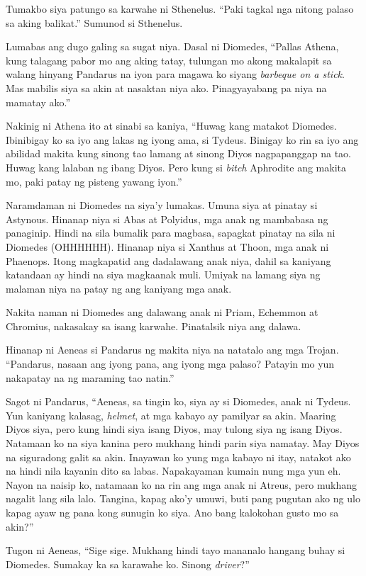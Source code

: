 \documentclass[12pt,letterpaper]{report}
\begin{document}
Tumakbo siya patungo sa karwahe ni Sthenelus. ``Paki tagkal nga nitong palaso sa aking balikat.'' Sumunod si Sthenelus.

Lumabas ang dugo galing sa sugat niya. Dasal ni Diomedes, ``Pallas Athena, kung talagang pabor mo ang aking tatay, tulungan mo akong makalapit sa walang hinyang Pandarus na iyon para magawa ko siyang \textit{barbeque on a stick}. Mas mabilis siya sa akin at nasaktan niya ako. Pinagyayabang pa niya na mamatay ako.''

Nakinig ni Athena ito at sinabi sa kaniya, ``Huwag kang matakot Diomedes. Ibinibigay ko sa iyo ang lakas ng iyong ama, si Tydeus. Binigay ko rin sa iyo ang abilidad makita kung sinong tao lamang at sinong Diyos nagpapanggap na tao. Huwag kang lalaban ng ibang Diyos. Pero kung si \textit{bitch} Aphrodite ang makita mo, paki patay ng pisteng yawang iyon.''

Naramdaman ni Diomedes na siya'y lumakas. Umuna siya at pinatay si Astynous. Hinanap niya si Abas at Polyidus, mga anak ng mambabasa ng panaginip. Hindi na sila bumalik para magbasa, sapagkat pinatay na sila ni Diomedes (OHHHHHH). Hinanap niya si Xanthus at Thoon, mga anak ni Phaenops. Itong magkapatid ang dadalawang anak niya, dahil sa kaniyang katandaan ay hindi na siya magkaanak muli. Umiyak na lamang siya ng malaman niya na patay ng ang kaniyang mga anak.

Nakita naman ni Diomedes ang dalawang anak ni Priam, Echemmon at Chromius, nakasakay sa isang karwahe. Pinatalsik niya ang dalawa.

Hinanap ni Aeneas si Pandarus ng makita niya na natatalo ang mga Trojan. ``Pandarus, nasaan ang iyong pana, ang iyong mga palaso? Patayin mo yun nakapatay na ng maraming tao natin.''

Sagot ni Pandarus, ``Aeneas, sa tingin ko, siya ay si Diomedes, anak ni Tydeus. Yun kaniyang kalasag, \textit{helmet}, at mga kabayo ay pamilyar sa akin. Maaring Diyos siya, pero kung hindi siya isang Diyos, may tulong siya ng isang Diyos. Natamaan ko na siya kanina pero mukhang hindi parin siya namatay. May Diyos na siguradong galit sa akin. Inayawan ko yung mga kabayo ni itay, natakot ako na hindi nila kayanin dito sa labas. Napakayaman kumain nung mga yun eh. Nayon na naisip ko, natamaan ko na rin ang mga anak ni Atreus, pero mukhang nagalit lang sila lalo. Tangina, kapag ako'y umuwi, buti pang pugutan ako ng ulo kapag ayaw ng pana kong sunugin ko siya. Ano bang kalokohan gusto mo sa akin?''

Tugon ni Aeneas, ``Sige sige. Mukhang hindi tayo mananalo hangang buhay si Diomedes. Sumakay ka sa karawahe ko. Sinong \textit{driver}?''
\end{document}
